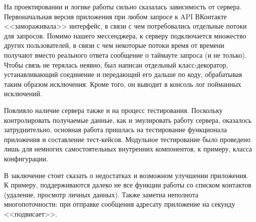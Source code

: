 \documentclass[12pt]{article}
\begin{document}
На проектировании и логике работы сильно сказалась зависимость от сервера. Первоначальная версия приложения при любом запросе к API ВКонтакте <<замораживала>> интерфейс, в связи с чем потребовались отдельные потоки для запросов. Помимо нашего мессенджера, к серверу подключается множество других пользователей, в связи с чем некоторые потоки время от времени получают вместо реального ответа сообщение о таймауте запроса (и не только). Чтобы связь не терялась неявно, был написан отдельный класс-декоратор, устанавливающий соединение и передающий его дальше по коду, обрабатывая таким образом исключения. Кроме того, он выводит в консоль лог пойманных исключений. \newline

Повлияло наличие сервера также и на процесс тестирования. Поскольку контролировать получаемые данные, как и эмулировать работу сервера, оказалось затруднительно, основная работа пришлась на тестирование функционала приложения и составление тест-кейсов. Модульное тестирование было проведено лишь для немногих самостоятельных внутренних компонентов, к примеру, класса конфигурации.

В заключение стоит сказать о недостатках и возможном улучшении приложения. К примеру, поддерживаются далеко не все функции работы со списком контактов (удаление, просмотр личных данных). Также заметна неполнота многопоточности: при отправке сообщения адресату приложение на секунду <<подвисает>>.
\end{document}
